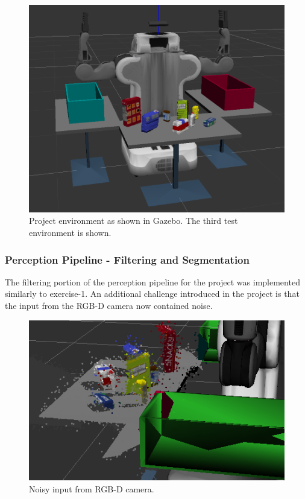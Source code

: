 \documentclass{article}
\begin{document}
\begin{figure}[H]
    \includegraphics[width=\linewidth]{pr2.png}
    \caption{Project environment as shown in Gazebo. The third test environment is shown.}
    \label{fig:pr2}
\end{figure}

\subsubsection{Perception Pipeline - Filtering and Segmentation}
The filtering portion of the perception pipeline for the project was implemented similarly to exercise-1. An additional challenge introduced in the project is that the input from the RGB-D camera now contained noise.

\begin{figure}[H]
    \includegraphics[width=\linewidth]{pr2noise.png}
    \caption{Noisy input from RGB-D camera.}
    \label{fig:noise}
\end{figure}
\end{document}
